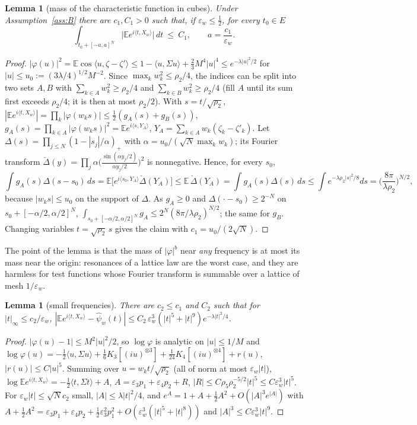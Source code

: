 \documentclass[10pt]{article}
\newtheorem{lemma}[theorem]{Lemma}
\theoremstyle{definition}
\theoremstyle{remark}
\newcommand{\E}{\mathbb{E}}
\newcommand{\inner}[2]{\langle #1, #2\rangle}
\newcommand{\ew}{\varepsilon_w}
\begin{document}
\begin{lemma}[mass of the characteristic function in cubes]\label{lem:cube}
Under Assumption~\ref{ass:B} there are $c_1,C_1>0$ such that, if $\ew\le\frac12$, for every $t_0\in E$
\[
\int_{t_0+[-a,a]^N}\Big|\E e^{i\inner t{X_w}}\Big|\,dt\ \le\ C_1,\qquad a=\frac{c_1}{\ew}.
\]
\end{lemma}
\begin{proof}
$|\varphi(u)|^2=\E\cos\inner u{\zeta-\zeta'}\le1-\inner u{\Sigma u}+\frac23M^4|u|^4\le e^{-\lambda|u|^2/2}$ for
$|u|\le u_0:=(3\lambda/4)^{1/2}M^{-2}$. Since $\max_kw_k^2\le\rho_2/4$, the indices can be split into two sets $A,B$
with $\sum_{k\in A}w_k^2\ge\rho_2/4$ and $\sum_{k\in B}w_k^2\ge\rho_2/4$ (fill $A$ until its sum first exceeds $\rho_2/4$;
it is then at most $\rho_2/2$). With $s=t/\sqrt{\rho_2}$, $|\E e^{i\inner t{X_w}}|=\prod_k|\varphi(w_ks)|\le\frac12(g_A(s)+g_B(s))$,
$g_A(s)=\prod_{k\in A}|\varphi(w_ks)|^2=\E e^{i\inner s{Y_A}}$, $Y_A=\sum_{k\in A}w_k(\zeta_k-\zeta'_k)$. Let
$\Delta(s)=\prod_{j\le N}(1-|s_j|/\alpha)_+$ with $\alpha=u_0/(\sqrt N\max_kw_k)$; its Fourier transform
$\check\Delta(y)=\prod_j\alpha\big(\frac{\sin(\alpha y_j/2)}{\alpha y_j/2}\big)^2$ is nonnegative. Hence, for every $s_0$,
\[
\int g_A(s)\Delta(s-s_0)\,ds=\E\big[e^{i\inner{s_0}{Y_A}}\check\Delta(Y_A)\big]\le\E\,\check\Delta(Y_A)=\int g_A(s)\Delta(s)\,ds
\le\int e^{-\lambda\rho_2|s|^2/8}ds=\Big(\frac{8\pi}{\lambda\rho_2}\Big)^{N/2},
\]
because $|w_ks|\le u_0$ on the support of $\Delta$. As $g_A\ge0$ and $\Delta(\cdot-s_0)\ge2^{-N}$ on
$s_0+[-\alpha/2,\alpha/2]^N$, $\int_{s_0+[-\alpha/2,\alpha/2]^N}g_A\le2^N(8\pi/\lambda\rho_2)^{N/2}$; the same for $g_B$.
Changing variables $t=\sqrt{\rho_2}\,s$ gives the claim with $c_1=u_0/(2\sqrt N)$.
\end{proof}

The point of the lemma is that the mass of $|\varphi|^b$ near \emph{any} frequency is at most its mass near the
origin: resonances of a lattice law are the worst case, and they are harmless for test functions whose Fourier
transform is summable over a lattice of mesh $1/\ew$.

\begin{lemma}[small frequencies]\label{lem:near}
There are $c_2\le c_1$ and $C_2$ such that for $|t|_\infty\le c_2/\ew$,
$|\E e^{i\inner t{X_w}}-\widehat\psi_w(t)|\le C_2\,\ew^3(|t|^5+|t|^{9})e^{-\lambda|t|^2/4}$.
\end{lemma}
\begin{proof}
$|\varphi(u)-1|\le M^2|u|^2/2$, so $\log\varphi$ is analytic on $|u|\le1/M$ and
$\log\varphi(u)=-\frac12\inner u{\Sigma u}+\frac16K_3[(iu)^{\otimes3}]+\frac1{24}K_4[(iu)^{\otimes4}]+r(u)$, $|r(u)|\le C|u|^5$.
Summing over $u=w_kt/\sqrt{\rho_2}$ (all of norm at most $\ew|t|$),
$\log\E e^{i\inner t{X_w}}=-\frac12\inner t{\Sigma t}+A$, $A=\varepsilon_3p_1+\varepsilon_4p_2+R$,
$|R|\le C\rho_5\rho_2^{-5/2}|t|^5\le C\ew^3|t|^5$. For $\ew|t|\le\sqrt Nc_2$ small, $|A|\le\lambda|t|^2/4$, and
$e^A=1+A+\frac12A^2+O(|A|^3e^{|A|})$ with $A+\frac12A^2=\varepsilon_3p_1+\varepsilon_4p_2+\frac12\varepsilon_3^2p_1^2
+O(\ew^3(|t|^5+|t|^8))$ and $|A|^3\le C\ew^3|t|^9$.
\end{proof}
\end{document}
